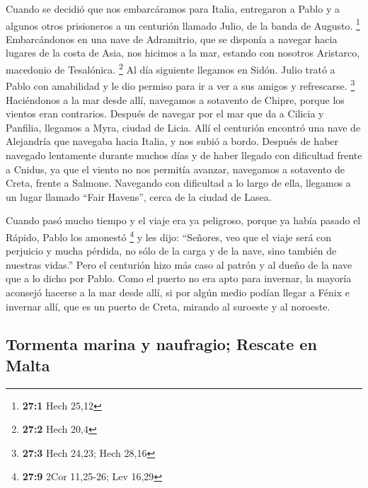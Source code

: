 \begin{paracol}{2}
 Cuando se decidió que nos embarcáramos para Italia,
entregaron a Pablo y a algunos otros prisioneros a un centurión llamado
Julio, de la banda de Augusto. \footnote{\textbf{27:1} Hech 25,12}
 Embarcándonos en una nave de Adramitrio, que se disponía
a navegar hacia lugares de la costa de Asia, nos hicimos a la mar,
estando con nosotros Aristarco, macedonio de Tesalónica. \footnote{\textbf{27:2}
  Hech 20,4}  Al día siguiente llegamos en Sidón. Julio
trató a Pablo con amabilidad y le dio permiso para ir a ver a sus amigos
y refrescarse. \footnote{\textbf{27:3} Hech 24,23; Hech 28,16}
 Haciéndonos a la mar desde allí, navegamos a sotavento de
Chipre, porque los vientos eran contrarios.  Después de
navegar por el mar que da a Cilicia y Panfilia, llegamos a Myra, ciudad
de Licia.  Allí el centurión encontró una nave de
Alejandría que navegaba hacia Italia, y nos subió a bordo.
 Después de haber navegado lentamente durante muchos días
y de haber llegado con dificultad frente a Cnidus, ya que el viento no
nos permitía avanzar, navegamos a sotavento de Creta, frente a Salmone.
 Navegando con dificultad a lo largo de ella, llegamos a
un lugar llamado ``Fair Havens'', cerca de la ciudad de Lasea.

 Cuando pasó mucho tiempo y el viaje era ya peligroso,
porque ya había pasado el Rápido, Pablo los amonestó \footnote{\textbf{27:9}
  2Cor 11,25-26; Lev 16,29}  y les dijo: ``Señores, veo
que el viaje será con perjuicio y mucha pérdida, no sólo de la carga y
de la nave, sino también de nuestras vidas.''  Pero el
centurión hizo más caso al patrón y al dueño de la nave que a lo dicho
por Pablo.  Como el puerto no era apto para invernar, la
mayoría aconsejó hacerse a la mar desde allí, si por algún medio podían
llegar a Fénix e invernar allí, que es un puerto de Creta, mirando al
suroeste y al noroeste.

\hypertarget{tormenta-marina-y-naufragio-rescate-en-malta}{%
\subsection{Tormenta marina y naufragio; Rescate en
Malta}\label{tormenta-marina-y-naufragio-rescate-en-malta}}


\end{paracol}
